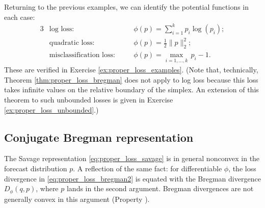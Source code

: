 Returning to the previous examples, we can identify the potential functions in
each case:
\begin{alignat*}{3}
&\text{log loss:} \quad &&\phi(p) = \sum_{i=1}^k p_i \log(p_i); \\
&\text{quadratic loss:} \quad &&\phi(p) = \frac{1}{2} \|p\|_2^2; \\
&\text{misclassification loss:} \quad &&\phi(p) = \max_{i=1,\dots,k} \, p_i - 1. 
\end{alignat*}
These are verified in Exercise \ref{ex:proper_loss_examples}. (Note that,
technically, Theorem \ref{thm:proper_loss_bregman} does not apply to log loss
because this loss takes infinite values on the relative boundary of the 
simplex. An extension of this theorem to such unbounded losses is given in
Exercise \ref{ex:proper_loss_unbounded}.) 

\subsection{Conjugate Bregman representation} 

The Savage representation \eqref{eq:proper_loss_savage} is in general nonconvex
in the forecast distribution $p$. A reflection of the same fact: for
differentiable $\phi$, the loss divergence in \eqref{eq:proper_loss_bregman2}
is equated with the Bregman divergence $D_\phi(q,p)$, where $p$ lands in the
second argument. Bregman divergences are not generally convex in this argument
(Property ).  

